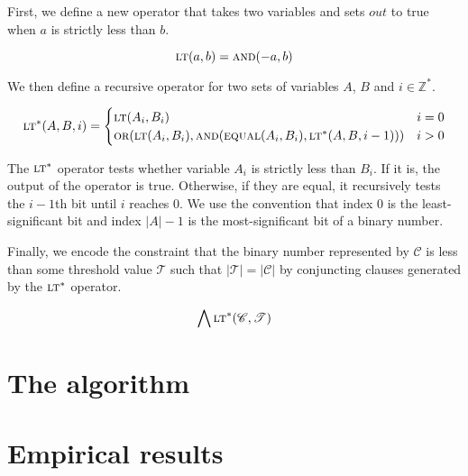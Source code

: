 \documentclass{article}
\begin{document}
\noindent First, we define a new operator that takes two variables and sets
$out$ to true when $a$ is strictly less than $b$.

\begin{equation}
  \textsc{lt}(a, b) = \textsc{and}(-a, b)
\end{equation}\break

\noindent We then define a recursive operator for two sets of variables $A$,
$B$ and $i \in \mathbb{Z}^*$.

\begin{equation}
  \textsc{lt}^*(A, B, i) = \begin{cases}
    \textsc{lt}(A_i, B_i) & i = 0 \\
    \textsc{or}(\textsc{lt}(A_i, B_i), \textsc{and}(\textsc{equal}(A_i, B_i), \textsc{lt}^*(A, B, i - 1))) & i > 0
  \end{cases}
\end{equation}\break

\noindent The $\textsc{lt}^*$ operator tests whether variable $A_i$ is strictly
less than $B_i$. If it is, the output of the operator is true. Otherwise, if
they are equal, it recursively tests the $i - 1$th bit until $i$ reaches $0$. We
use the convention that index $0$ is the least-significant bit and index $\vert
A \vert - 1$ is the most-significant bit of a binary number.

Finally, we encode the constraint that the binary number represented by
$\mathscr{C}$ is less than some threshold value $\mathscr{T}$ such that  $\vert
\mathscr{T} \vert = \vert \mathscr{C} \vert$ by conjuncting clauses generated
by the $\textsc{lt}^*$ operator.

\begin{equation}
  \bigwedge \textsc{lt}^*(\mathscr{C}, \mathscr{T})
\end{equation}\break

\section{The algorithm}

\section{Empirical results}

\end{document}
